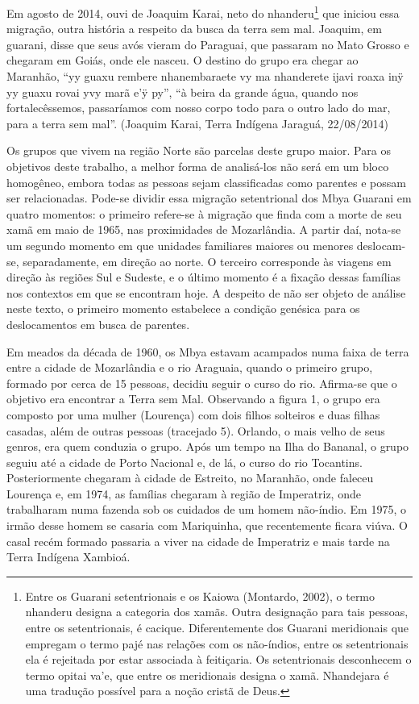 Em agosto de 2014, ouvi de Joaquim Karai, neto do
nhanderu\footnote{Entre os Guarani setentrionais e os Kaiowa (Montardo,
2002), o termo nhanderu designa a categoria dos xamãs. Outra designação
para tais pessoas, entre os setentrionais, é cacique. Diferentemente
dos Guarani meridionais que empregam o termo pajé nas relações com os
não-índios, entre os setentrionais ela é rejeitada por estar associada à
feitiçaria. Os setentrionais desconhecem o termo opitai va’e, que entre
os meridionais designa o xamã. Nhandejara é uma tradução possível para
a noção cristã de Deus.} que iniciou essa migração, outra história a
respeito da busca da terra sem mal. Joaquim, em guarani, disse que seus
avós vieram do Paraguai, que passaram no Mato Grosso e chegaram em
Goiás, onde ele nasceu. O destino do grupo era chegar ao Maranhão, ``yy
guaxu rembere nhanembaraete vy ma nhanderete ijavi roaxa inÿ yy guaxu
rovai yvy marã e’ÿ py'', ``à beira da grande água, quando nos
fortalecêssemos, passaríamos com nosso corpo todo para o outro lado do
mar, para a terra sem mal''. (Joaquim Karai, Terra Indígena Jaraguá,
22/08/2014)

Os grupos que vivem na região Norte são parcelas deste grupo maior. Para
os objetivos deste trabalho, a melhor forma de analisá-los não será em
um bloco homogêneo, embora todas as pessoas sejam classificadas como
parentes e possam ser relacionadas. Pode-se dividir essa migração
setentrional dos Mbya Guarani em quatro momentos: o primeiro refere-se
à migração que finda com a morte de seu xamã em maio de 1965, nas
proximidades de Mozarlândia. A partir daí, nota-se um segundo momento
em que unidades familiares maiores ou menores deslocam-se,
separadamente, em direção ao norte. O terceiro corresponde às viagens
em direção às regiões Sul e Sudeste, e o último momento é a fixação
dessas famílias nos contextos em que se encontram hoje. A despeito de
não ser objeto de análise neste texto, o primeiro momento estabelece a
condição genésica para os deslocamentos em busca de parentes.

Em meados da década de 1960, os Mbya estavam acampados numa faixa de
terra entre a cidade de Mozarlândia e o rio Araguaia, quando o primeiro
grupo, formado por cerca de 15 pessoas, decidiu seguir o curso do rio.
Afirma-se que o objetivo era encontrar a Terra sem Mal. Observando a
figura 1, o grupo era composto por uma mulher (Lourença) com dois
filhos solteiros e duas filhas casadas, além de outras pessoas
(tracejado 5). Orlando, o mais velho de seus genros, era quem conduzia
o grupo. Após um tempo na Ilha do Bananal, o grupo seguiu até a cidade
de Porto Nacional e, de lá, o curso do rio Tocantins. Posteriormente
chegaram à cidade de Estreito, no Maranhão, onde faleceu Lourença e, em
1974, as famílias chegaram à região de Imperatriz, onde trabalharam
numa fazenda sob os cuidados de um homem não-índio. Em 1975, o irmão
desse homem se casaria com Mariquinha, que recentemente ficara viúva. O
casal recém formado passaria a viver na cidade de Imperatriz e mais
tarde na Terra Indígena Xambioá. 


